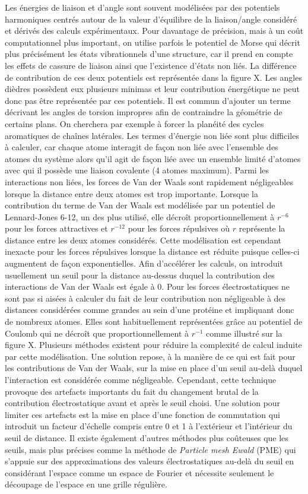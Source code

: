 Les énergies de liaison et d'angle sont souvent modélisées par des potentiels harmoniques centrés autour de la valeur d'équilibre de la liaison/angle considéré et dérivés des calculs expérimentaux. Pour davantage de précision, mais à un coût computationnel plus important, on utilise parfois le potentiel de Morse qui décrit plus précisément les états vibrationnels d'une structure, car il prend en compte les effets de cassure de liaison ainsi que l'existence d'états non liés. La différence de contribution de ces deux potentiels est représentée dans la figure X. Les angles dièdres possèdent eux plusieurs minimas et leur contribution énergétique ne peut donc pas être représentée par ces potentiels. Il est commun d'ajouter un terme décrivant les angles de torsion impropres afin de contraindre la géométrie de certains plans. On cherchera par exemple à forcer la planéité des cycles aromatiques de chaînes latérales.
Les termes d'énergie non liée sont plus difficiles à calculer, car chaque atome interagit de façon non liée avec l'ensemble des atomes du système alors qu'il agit de façon liée avec un ensemble limité d'atomes avec qui il possède une liaison covalente (4 atomes maximum). 
Parmi les interactions non liées, les forces de Van der Waals sont rapidement négligeables lorsque la distance entre deux atomes est trop importante. Lorsque la contribution du terme de Van der Waals est modélisée par un potentiel de Lennard-Jones 6-12, un des plus utilisé, elle décroît proportionnellement à $r^{-6}$ pour les forces attractives et $r^{-12}$ pour les forces répulsives où $r$ représente la distance entre les deux atomes considérés. Cette modélisation est cependant inexacte pour les forces répulsives lorsque la distance est réduite puisque celles-ci augmentent de façon exponentielles. Afin d'accélérer les calculs, on introduit usuellement un seuil pour la distance au-dessus duquel la contribution des interactions de Van der Waals est égale à 0.
Pour les forces électrostatiques ne sont pas si aisées à calculer du fait de leur contribution non négligeable à des distances considérées comme grandes au sein d'une protéine et impliquant donc de nombreux atomes. Elles sont habituellement représentées grâce au potentiel de Coulomb qui ne décroît que proportionnellement à $r^{-1}$ comme illustré sur la figure X. Plusieurs méthodes existent pour réduire la complexité de calcul induite par cette modélisation. Une solution repose, à la manière de ce qui est fait pour les contributions de Van der Waals, sur la mise en place d'un seuil au-delà duquel l'interaction est considérée comme négligeable. Cependant, cette technique provoque des artefacts importants du fait du changement brutal de la contribution électrostatique avant et après le seuil choisi. Une solution pour limiter ces artefacts est la mise en place d'une fonction de commutation qui introduit un facteur d'échelle compris entre 0 et 1 à l'extérieur et l'intérieur du seuil de distance. Il existe également d'autres méthodes plus coûteuses que les seuils, mais plus précises comme la méthode de \textit{Particle mesh Ewald} (PME) qui s'appuie sur des approximations des valeurs électrostatiques au-delà du seuil en considérant l'espace comme un espace de Fourier et nécessite seulement le découpage de l'espace en une grille régulière.

